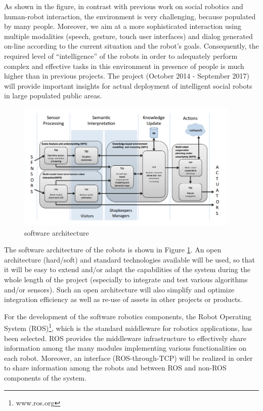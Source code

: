 As shown in the figure, in contrast with previous work on social robotics and human-robot interaction, the \coaches environment is very challenging, because populated by many people.
Moreover, we aim at a more sophisticated interaction using multiple modalities (speech, gesture, touch user interfaces) and dialog generated on-line according to the current situation
and the robot's goals.
Consequently, the required level of ``intelligence'' of the \coaches robots in order to adequately perform complex and effective tasks in this environment in presence of people is much higher than in previous projects.
The \coaches project (October 2014 - September 2017) will provide important insights for actual deployment of intelligent social robots in large populated public areas. 



\begin{figure}[t!]
\centering
\includegraphics[width=0.95\textwidth]{fig/COACHES_swarch.png}
\caption{\coaches software architecture}
\label{fig:swarch}
\end{figure}

The software architecture of the \coaches robots is shown in Figure \ref{fig:swarch}.
An open architecture (hard/soft) and standard technologies available will be used, 
so that it will be easy to extend and/or adapt the capabilities of the system during the whole length of 
the  project  (especially  to  integrate  and  test  various  algorithms  and/or  sensors).  
Such an open architecture will also simplify and optimize integration efficiency as well as re-use of assets in other projects or products. 


For the development of the software robotics components, the Robot Operating System (ROS)\footnote{www.ros.org}, which is the standard middleware for robotics applications, has been selected.
ROS provides the middleware infrastructure to effectively share information among the many modules implementing various functionalities on each robot. Moreover, an interface (ROS-through-TCP) will be realized in order to share information among the robots and between ROS and non-ROS components of the system.

